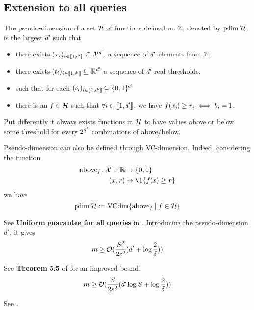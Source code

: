 \subsection{Extension to all queries}



\begin{tcolorbox}
	\begin{definition}
		The pseudo-dimension of a set $\mathcal{H}$ of functions defined on $\mathcal{X}$, denoted by $\operatorname{pdim}\mathcal{H}$, is the largest ${d'}$ such that 
	\begin{itemize}
		\item there exists $(x_{i})_{i\in \llbracket 1,{d'} \rrbracket} \subseteq \mathcal{X}^{d'}$, a sequence of ${d'}$ elements from $\mathcal{X}$,
		\item there exists $(t_i)_{i\in \llbracket 1,{d'} \rrbracket} \subseteq  \mathbb{R}^{d'}$ a sequence of ${d'}$ real thresholds,
		\item such that for each $(b_i)_{i\in \llbracket 1,{d'} \rrbracket} \subseteq \{0,1\}^{d'}$
		\item there is an $f \in \mathcal{H}$ such that $\forall i \in \llbracket 1,{d'} \rrbracket$, we have $f(x_i) \geq r_i \iff b_i = 1$. 
	\end{itemize}
	Put differently it always exists functions in $\mathcal{H}$ to have values above or below some threshold for every $2^{d'}$ combinations of above/below.
\end{definition}
Pseudo-dimension can also be defined through VC-dimension. Indeed, considering the function
\begin{align*}
	\operatorname{above}_\query \colon \mathcal{X} \times \RR &\to \{0,1\}\\
	(x,r) &\mapsto \1\{f(x) \geq r\}
\end{align*}
we have
\begin{equation}
	\operatorname{pdim}\mathcal{H} := \operatorname{VCdim}\{\operatorname{above}_f \mid f \in \mathcal{H}\}
\end{equation}
\end{tcolorbox}





See \textbf{Uniform guarantee for all queries} in \cite{bachem2017coresetML}. Introducing the pseudo-dimension $d'$, it gives
\begin{equation}
	m \geq \mathcal{O}(\frac{S^{2}}{2 \varepsilon^{2}} (d' + \log \frac{2}{\delta}))
\end{equation}

See \textbf{Theorem 5.5} of \cite{braverman2016coresetsota} for an improved bound.
\begin{equation}
	m \geq \mathcal{O}(\frac{S}{2 \varepsilon^{2}} (d' \log S + \log \frac{2}{\delta}))
\end{equation}

See \cite{bachem2017coresetML}.
